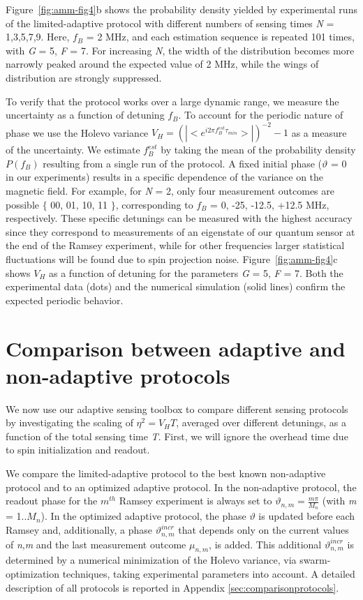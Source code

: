Figure \,\ref{fig:amm-fig4}b shows the probability density yielded by experimental runs of the limited-adaptive protocol with different numbers of sensing times \textit{N} = 1,3,5,7,9. Here,  $f_B$ = 2 MHz, and each estimation sequence is repeated 101 times, with \textit{G} = 5, \textit{F} = 7. For increasing \textit{N}, the width of the distribution becomes more narrowly peaked around the expected value of 2 MHz, while the wings of distribution are strongly suppressed. 

To verify that the protocol works over a large dynamic range, we measure the uncertainty as a function of detuning $f_B$. To account for the periodic nature of phase we use the Holevo variance $V_H = (|<e^{i2 \pi f_B^{est} \tau_{min}}>|)^{-2} - 1$ as a measure of the uncertainty. We estimate  $f_B^{est}$ by taking the mean of the probability density $P(f_B)$ resulting from a single run of the protocol. A fixed initial phase ($\vartheta$ = 0 in our experiments) results in a specific dependence of the variance on the magnetic field. For example, for \textit{N} = 2, only four measurement outcomes are possible $\{$ 00, 01, 10, 11 $\}$, corresponding to $f_B$ = 0, -25, -12.5, +12.5 MHz, respectively. These specific detunings can be measured with the highest accuracy since they correspond to measurements of an eigenstate of our quantum sensor at the end of the Ramsey experiment, while for other frequencies larger statistical fluctuations will be found due to spin projection noise. Figure \,\ref{fig:amm-fig4}c shows $V_H$ as a function of detuning for the parameters \textit{G} = 5, \textit{F} = 7. Both the experimental data (dots) and the numerical simulation (solid lines) confirm the expected periodic behavior.

\section{Comparison between adaptive and non-adaptive protocols}
We now use our adaptive sensing toolbox to compare different sensing protocols by investigating the scaling of $\eta^2 = V_H T$, averaged over different detunings, as a function of the total sensing time \textit{T}. First, we will ignore the overhead time due to spin initialization and readout. 

We compare the limited-adaptive protocol to the best known non-adaptive protocol and to an optimized adaptive protocol. In the non-adaptive protocol\cite{Said_Phys.Rev.B_2011,Waldherr_NatNano_2012,Nusran_NatNano_2012}, the readout phase for the $m^{th}$ Ramsey experiment is always set to $\vartheta_{n,m} = \frac{m\pi}{M_n}$  (with \textit{m} = 1..$M_n$). In the optimized adaptive protocol\cite{Hentschel_Phys.Rev.Lett._2010,Hayes_Phys.Rev.A_2014}, the phase $\vartheta$ is updated before each Ramsey and, additionally, a phase $\vartheta_{n,m}^{incr}$ that depends only on the current values of \textit{n},\textit{m} and the last measurement outcome $\mu_{n,m}$, is added. This additional $\vartheta_{n,m}^{incr}$ is determined by a numerical minimization of the Holevo variance, via swarm-optimization techniques, taking experimental parameters into account. A detailed description of all protocols is reported in Appendix \ref{sec:comparisonprotocols}.

